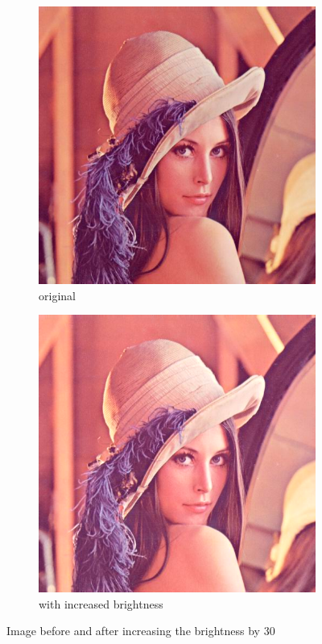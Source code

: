 \documentclass[12pt]{article}
\theoremstyle{definition}
\newcommand{\subfiguresize}{.3\textwidth}
\begin{document}
\begin{figure}[H]\centering
    \begin{subfigure}[t]{\subfiguresize}\centering
        \includegraphics[width=\textwidth]{lenac.png}
        \caption{original}
    \end{subfigure}
    \hspace{.05\textwidth}
    \begin{subfigure}[t]{\subfiguresize}\centering
        \includegraphics[width=\textwidth]{lenac_bright+30.png}
        \caption{with increased brightness}
    \end{subfigure}
    \caption{Image before and after increasing the brightness by 30}
\end{figure}
\end{document}
